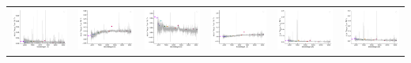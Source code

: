 \begin{center}
\begin{longtable}{l l l l l l }
    \includegraphics[width=0.3\linewidth, clip]{Figs/Figs-sdss/spec-1474-52933-0296-STRIPE82-0127-008930.pdf} & \includegraphics[width=0.3\linewidth, clip]{Figs/Figs-sdss/spec-1475-52903-0561-STRIPE82-0134-039543.pdf} & \includegraphics[width=0.3\linewidth, clip]{Figs/Figs-sdss/spec-1492-52932-0553-STRIPE82-0010-005855.pdf} & \includegraphics[width=0.3\linewidth, clip]{Figs/Figs-sdss/spec-1493-52933-0207-STRIPE82-0011-008529.pdf} & \includegraphics[width=0.3\linewidth, clip]{Figs/Figs-sdss/spec-1494-52937-0249-STRIPE82-0013-010873.pdf} & \includegraphics[width=0.3\linewidth, clip]{Figs/Figs-sdss/spec-1509-52942-0633-STRIPE82-0058-020465.pdf} \\

\end{longtable}
\end{center}
